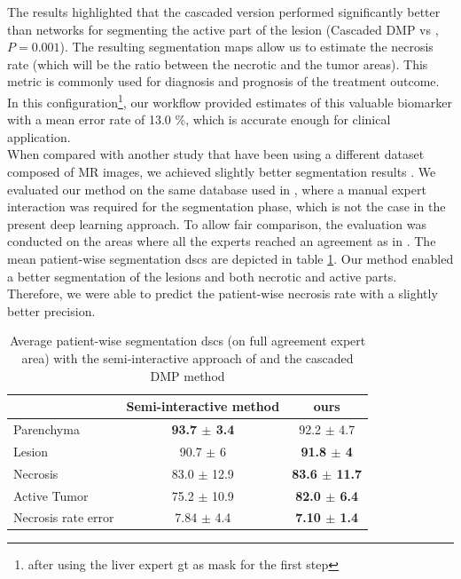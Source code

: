 The results highlighted that the cascaded version performed significantly better than  networks for segmenting the active part of the lesion (Cascaded DMP vs , $P = 0.001$).
The resulting segmentation maps allow us to estimate the necrosis rate (which will be the ratio between the necrotic and the tumor areas). This metric is commonly used for diagnosis and prognosis of the treatment outcome. In this configuration\footnote{after using the liver expert \ac{gt} as mask for the first step}, our workflow provided estimates of this valuable biomarker with a mean error rate of 13.0 \%, which is accurate enough for clinical application. \\

When compared with another study that have been using a different dataset composed of MR images, we achieved slightly better segmentation results \cite{Zhang}.
We evaluated our method on the same database used in \cite{Conze2017}, where a manual expert interaction was required for the segmentation phase, which is not the case in the present deep learning approach. To allow fair comparison, the evaluation was conducted on the areas where all the experts reached an agreement as in \cite{Conze2017}. The mean patient-wise segmentation \ac{dsc}s are depicted in table \ref{ComparisionConze}. Our method enabled a better segmentation of the lesions and both necrotic and active parts. Therefore, we were able to predict the patient-wise necrosis rate with a slightly better precision. 

\begin{table}[ht!]
\caption{Average patient-wise segmentation \ac{dsc}s (on full agreement expert area) with the semi-interactive approach of \cite{Conze2017} and the cascaded DMP method}
\begin{tabular}{lcc}
\hline
& Semi-interactive method \cite{Conze2017} & ours \\
\hline
Parenchyma & \textbf{93.7 $\pm$ 3.4} & 92.2 $\pm$ 4.7 \\
Lesion & 90.7 $\pm$ 6 & \textbf{91.8 $\pm$ 4} \\
Necrosis & 83.0 $\pm$ 12.9 & \textbf{83.6 $\pm$ 11.7} \\
Active Tumor & 75.2 $\pm$ 10.9 & \textbf{82.0 $\pm$ 6.4} \\
Necrosis rate error & 7.84 $\pm$ 4.4 & \textbf{7.10 $\pm$ 1.4} \\
\hline
\end{tabular}
\label{ComparisionConze}
\end{table}

